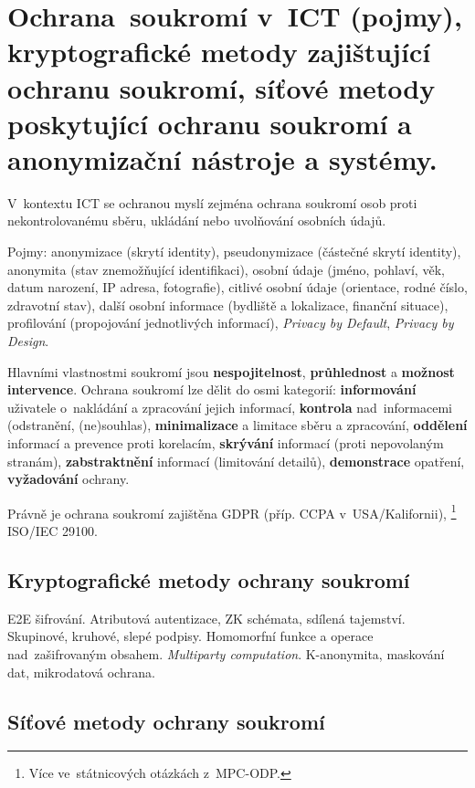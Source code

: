 \clearpage
\section{Ochrana~soukromí v~ICT (pojmy), kryptografické metody zajištující ochranu soukromí, síťové metody poskytující ochranu soukromí a anonymizační nástroje a systémy.}

V~kontextu ICT se ochranou myslí zejména ochrana soukromí osob proti nekontrolovanému sběru, ukládání nebo uvolňování osobních údajů.

Pojmy: anonymizace (skrytí identity), pseudonymizace (částečné skrytí identity), anonymita (stav znemožňující identifikaci), osobní údaje (jméno, pohlaví, věk, datum narození, IP adresa, fotografie), citlivé osobní údaje (orientace, rodné číslo, zdravotní stav), další osobní informace (bydliště a lokalizace, finanční situace), profilování (propojování jednotlivých informací), \emph{Privacy by Default}, \emph{Privacy by Design}.

Hlavními vlastnostmi soukromí jsou \textbf{nespojitelnost}, \textbf{průhlednost} a \textbf{možnost intervence}.
Ochrana soukromí lze dělit do osmi kategorií:
\textbf{informování} uživatele o~nakládání a zpracování jejich informací, \textbf{kontrola} nad~informacemi (odstranění, (ne)souhlas), \textbf{minimalizace} a limitace sběru a zpracování, \textbf{oddělení} informací a prevence proti korelacím, \textbf{skrývání} informací (proti nepovolaným stranám), \textbf{zabstraktnění} informací (limitování detailů), \textbf{demonstrace} opatření, \textbf{vyžadování} ochrany.

Právně je ochrana soukromí zajištěna GDPR (příp. CCPA v~USA/Kalifornii),%
\footnote{Více ve~státnicových otázkách z~MPC-ODP.}
ISO/IEC 29100.


\subsection{Kryptografické metody ochrany soukromí}

E2E šifrování.
Atributová autentizace, ZK schémata, sdílená tajemství.
Skupinové, kruhové, slepé podpisy.
Homomorfní funkce a operace nad~zašifrovaným obsahem.
\emph{Multiparty computation}.
K-anonymita, maskování dat, mikrodatová ochrana.


\subsection{Síťové metody ochrany soukromí}

